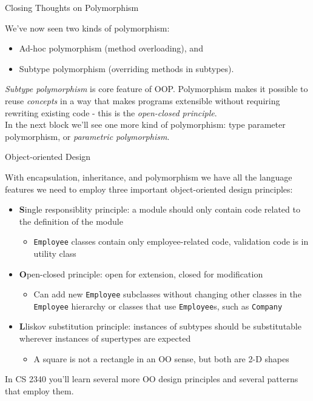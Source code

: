 \documentclass{beamer}
\begin{document}
\begin{frame}[fragile]{Closing Thoughts on Polymorphism}

We've now seen two kinds of polymorphism:
\begin{itemize}
\item Ad-hoc polymorphism (method overloading), and
\item Subtype polymorphism (overriding methods in subtypes).
\end{itemize}

{\it Subtype polymorphism} is core feature of OOP.  Polymorphism makes it possible to reuse {\it concepts} in a way that makes programs extensible without requiring rewriting existing code - this is the {\it open-closed principle}.\\
\vspace{.1in}
In the next block we'll see one more kind of polymorphism: type parameter polymorphism, or {\it parametric polymorphism}.
\end{frame}

\begin{frame}[fragile]{Object-oriented Design}

With encapsulation, inheritance, and polymorphism we have all the language features we need to employ three important object-oriented design principles:
\begin{itemize}
\item {\bf S}ingle responsiblity principle: a module should only contain code related to the definition of the module
  \begin{itemize}
    \item {\tt Employee} classes contain only employee-related code, validation code is in utility class
  \end{itemize}
\item {\bf O}pen-closed principle: open for extension, closed for modification
  \begin{itemize}
    \item Can add new {\tt Employee} subclasses without changing other classes in the {\tt Employee} hierarchy or classes that use {\tt Employee}s, such as {\tt Company}
  \end{itemize}
\item {\bf L}liskov substitution principle: instances of subtypes should be substitutable wherever instances of supertypes are expected
  \begin{itemize}
    \item A square is not a rectangle in an OO sense, but both are 2-D shapes
  \end{itemize}
\end{itemize}

In CS 2340 you'll learn several more OO design principles and several patterns that employ them.

\end{frame}
\end{document}
